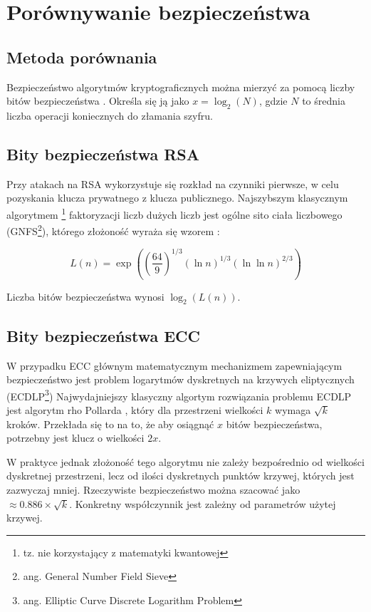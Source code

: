 \documentclass[conference]{IEEEtran}
\begin{document}
\section{Porównywanie bezpieczeństwa}

\subsection{Metoda porównania}
Bezpieczeństwo algorytmów kryptograficznych można mierzyć za pomocą liczby bitów bezpieczeństwa \cite{BitSecurityOfCryptographicPrimitives}. Określa się ją jako \( x = \log_2(N) \), gdzie \( N \) to średnia liczba operacji koniecznych do złamania szyfru.

\subsection{Bity bezpieczeństwa RSA}

Przy atakach na RSA wykorzystuje się rozkład na czynniki pierwsze, w celu pozyskania klucza prywatnego z klucza publicznego. Najszybszym klasycznym algorytmem \footnote{tz. nie korzystający z matematyki kwantowej} faktoryzacji liczb dużych liczb jest ogólne sito ciała liczbowego (GNFS\footnote{ang. General Number Field Sieve}), którego złożoność wyraża się wzorem \cite{GNFSImplementation}:

\[
L(n) = \exp\left(\left(\frac{64}{9}\right)^{1/3} (\ln n)^{1/3} (\ln \ln n)^{2/3}\right)
\]

Liczba bitów bezpieczeństwa wynosi \( \log_2(L(n)) \).

\subsection{Bity bezpieczeństwa ECC}

W przypadku ECC głównym matematycznym mechanizmem zapewniającym bezpieczeństwo jest problem logarytmów dyskretnych na krzywych eliptycznych (ECDLP\footnote{ang. Elliptic Curve Discrete Logarithm Problem})
Najwydajniejszy klasyczny algortym rozwiązania problemu ECDLP jest algorytm rho Pollarda \cite{SolvingECDLP}, który dla przestrzeni wielkości \( k \) wymaga \(\sqrt{k}\) kroków.
Przekłada się to na to, że aby osiągnąć \( x \) bitów bezpieczeństwa, potrzebny jest klucz o wielkości \( 2x \).

W praktyce jednak złożoność tego algorytmu nie zależy bezpośrednio od wielkości dyskretnej przestrzeni, lecz od ilości dyskretnych punktów krzywej, których jest zazwyczaj mniej.
Rzeczywiste bezpieczeństwo można szacować jako \( \approx 0.886 \times \sqrt{k} \). Konkretny współczynnik jest zależny od parametrów użytej krzywej.
\end{document}
